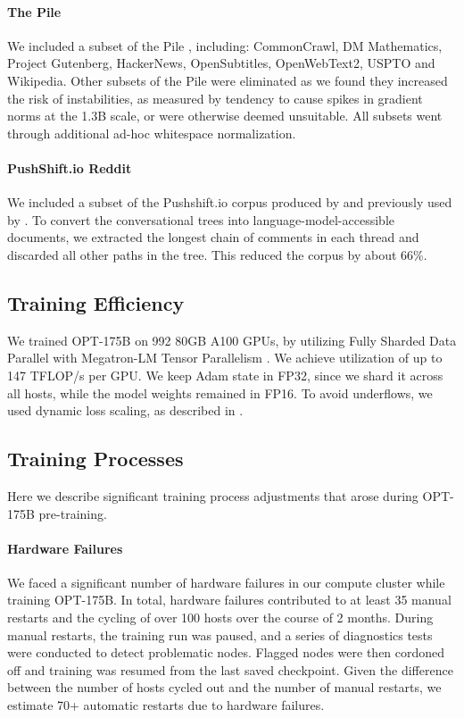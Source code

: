 \paragraph{The Pile} We included a subset of the Pile \cite{thepile}, including: CommonCrawl, DM Mathematics,  Project Gutenberg, HackerNews, OpenSubtitles, OpenWebText2, USPTO and Wikipedia. Other subsets of the Pile were eliminated as we found they increased the risk of instabilities, as measured by tendency to cause spikes in gradient norms at the 1.3B scale, or were otherwise deemed unsuitable.  All subsets went through additional ad-hoc whitespace normalization.

\paragraph{PushShift.io Reddit} We included a subset of the Pushshift.io corpus produced by \citet{reddit2020} and previously used by \citet{roller-etal-2021-recipes}. To convert the conversational trees into language-model-accessible documents, we extracted the longest chain of comments in each thread and discarded all other paths in the tree. This reduced the corpus by about 66\%.

\subsection{Training Efficiency}
\label{sec:training_efficiency}
We trained {OPT-175B} on 992 80GB A100 GPUs, by utilizing Fully Sharded Data Parallel \cite{1TMoE2021} with Megatron-LM Tensor Parallelism \cite{shoeybi2019megatron}. We achieve utilization of up to 147 TFLOP/s per GPU. We keep Adam state in FP32, since we shard it across all hosts, while the model weights remained in FP16. To avoid underflows, we used dynamic loss scaling, as described in \citet{micikevicius2017mixed}.

\subsection{Training Processes} Here we describe significant training process adjustments that arose during {OPT-175B} pre-training.

\label{sec:training_process}
\paragraph{Hardware Failures} We faced a significant number of hardware failures in our compute cluster while training {OPT-175B}. In total, hardware failures contributed to at least 35 manual restarts and the cycling of over 100 hosts over the course of 2 months. During manual restarts, the training run was paused, and a series of diagnostics tests were conducted to detect problematic nodes. Flagged nodes were then cordoned off and training was resumed from the last saved checkpoint. Given the difference between the number of hosts cycled out and the number of manual restarts, we estimate 70+ automatic restarts due to hardware failures. 

